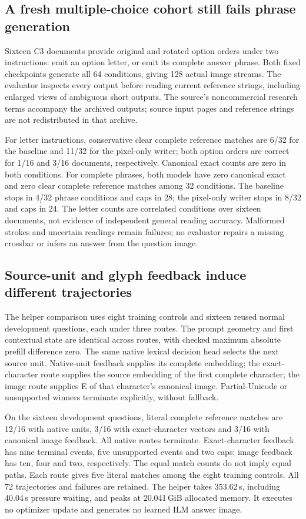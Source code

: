 \documentclass[10pt,a4paper]{article}
\providecommand{\DIFadd}[1]{{\protect\color{blue} \sf #1}} %
\begin{document}
\subsection*{\DIFadd{A fresh multiple-choice cohort still fails phrase generation}}
\DIFadd{Sixteen C3 documents provide original and rotated option orders under two
instructions: emit an option letter, or emit its complete answer phrase.
Both fixed checkpoints generate all 64 conditions, giving 128 actual image
streams. The evaluator inspects every output before reading current reference
strings, including enlarged views of ambiguous short outputs. The source's
noncommercial research terms accompany the archived outputs; source input
pages and reference strings are not redistributed in that archive.
}

\DIFadd{For letter instructions, conservative clear complete reference matches are
6/32 for the baseline and 11/32 for the pixel-only writer; both option orders
are correct for 1/16 and 3/16 documents, respectively. Canonical exact counts
are zero in both conditions. For complete phrases, both models have zero
canonical exact and zero clear complete reference matches among 32 conditions.
The baseline stops in 4/32 phrase conditions and caps in 28; the pixel-only
writer stops in 8/32 and caps in 24. The letter counts are correlated conditions
over sixteen documents, not evidence of independent general reading accuracy.
Malformed strokes and uncertain readings remain failures; no evaluator repairs
a missing crossbar or infers an answer from the question image.
}

\subsection*{\DIFadd{Source-unit and glyph feedback induce different trajectories}}
\DIFadd{The helper comparison uses eight training controls and sixteen reused normal
development questions, each under three routes. The prompt geometry and first
contextual state are identical across routes, with checked maximum absolute
prefill difference zero. The same native lexical decision head selects the
next source unit. Native-unit feedback supplies its complete embedding;
the exact-character route supplies the source embedding of the first complete
character; the image route supplies E of that character's canonical image.
Partial-Unicode or unsupported winners terminate explicitly, without fallback.
}

\DIFadd{On the sixteen development questions, literal complete reference matches are
12/16 with native units, 3/16 with exact-character vectors and 3/16 with canonical
image feedback. All native routes terminate. Exact-character feedback has nine
terminal events, five unsupported events and two caps; image feedback has ten,
four and two, respectively. The equal match counts do not imply equal paths.
Each route gives five literal matches among the eight training controls.
All 72 trajectories and failures are retained. The helper takes 353.62\,s,
including 40.04\,s pressure waiting, and peaks at 20.041\,GiB allocated memory.
It executes no optimizer update and generates no learned ILM answer image.
}
\end{document}
